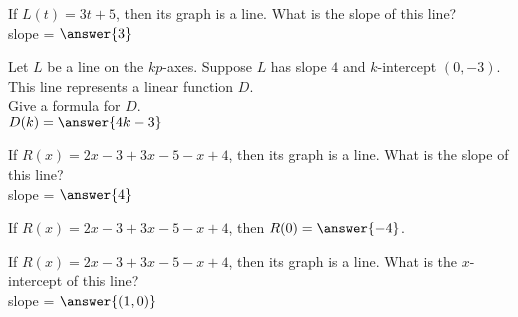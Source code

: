 \documentclass{ximera}
\begin{document}
\begin{exercise}

If $L(t) = 3t + 5$, then its graph is a line. What is the slope of this line? \\
slope = $\answer{3}$

\end{exercise}




\begin{exercise}

Let $L$ be a line on the $kp$-axes.  Suppose $L$ has slope $4$ and $k$-intercept $(0, -3)$.  \\
This line represents a linear function $D$.  \\
Give a formula for $D$. \\
$D(k) = \answer{4k - 3}$ 

\end{exercise}






\begin{exercise}

If $R(x) = 2x - 3 + 3x - 5 - x + 4$, then its graph is a line. What is the slope of this line? \\
slope = $\answer{4}$

\end{exercise}




\begin{exercise}

If $R(x) = 2x - 3 + 3x - 5 - x + 4$, then $R(0) = \answer{-4}$. \\


\end{exercise}





\begin{exercise}

If $R(x) = 2x - 3 + 3x - 5 - x + 4$, then its graph is a line. What is the $x$-intercept of this line? \\
slope = $\answer{(1,0)}$

\end{exercise}
\end{document}

